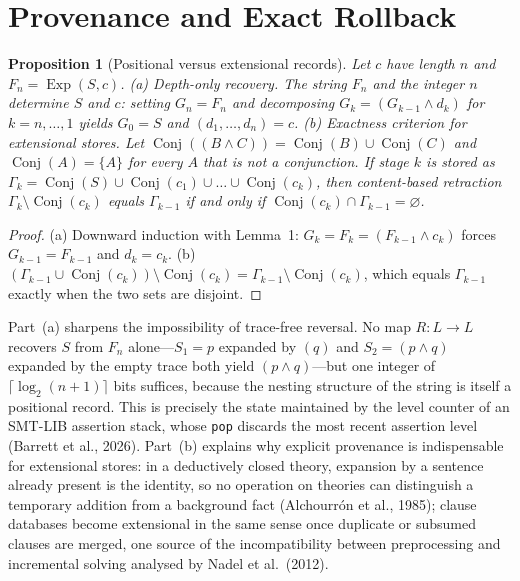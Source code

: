 \documentclass[11pt,reqno]{amsart}
\theoremstyle{plain}
\newtheorem{proposition}{Proposition}
\theoremstyle{definition}
\DeclareMathOperator{\Exp}{Exp}
\DeclareMathOperator{\Conj}{Conj}
\begin{document}
\section{Provenance and Exact Rollback}
\begin{proposition}[Positional versus extensional records]
Let $c$ have length $n$ and $F_n=\Exp(S,c)$.
\textup{(a) Depth-only recovery.} The string $F_n$ and the integer $n$ determine
$S$ and $c$: setting $G_n=F_n$ and decomposing $G_k=(G_{k-1}\wedge d_k)$ for
$k=n,\dots,1$ yields $G_0=S$ and $(d_1,\dots,d_n)=c$.
\textup{(b) Exactness criterion for extensional stores.} Let
$\Conj((B\wedge C))=\Conj(B)\cup\Conj(C)$ and $\Conj(A)=\{A\}$ for every $A$ that
is not a conjunction. If stage $k$ is stored as
$\Gamma_k=\Conj(S)\cup\Conj(c_1)\cup\dots\cup\Conj(c_k)$, then content-based
retraction $\Gamma_k\setminus\Conj(c_k)$ equals $\Gamma_{k-1}$ if and only if
$\Conj(c_k)\cap\Gamma_{k-1}=\varnothing$.
\end{proposition}
\begin{proof}
(a) Downward induction with Lemma~1: $G_k=F_k=(F_{k-1}\wedge c_k)$ forces
$G_{k-1}=F_{k-1}$ and $d_k=c_k$. (b)
$(\Gamma_{k-1}\cup\Conj(c_k))\setminus\Conj(c_k)=\Gamma_{k-1}\setminus\Conj(c_k)$,
which equals $\Gamma_{k-1}$ exactly when the two sets are disjoint.
\end{proof}

Part~(a) sharpens the impossibility of trace-free reversal. No map $R\colon L\to L$
recovers $S$ from $F_n$ alone---$S_1=p$ expanded by $(q)$ and $S_2=(p\wedge q)$
expanded by the empty trace both yield $(p\wedge q)$---but one integer of
$\lceil\log_2(n+1)\rceil$ bits suffices, because the nesting structure of the
string is itself a positional record. This is precisely the state maintained by the
level counter of an SMT-LIB assertion stack, whose \texttt{pop} discards the most
recent assertion level (Barrett et al., 2026). Part~(b) explains why explicit
provenance is indispensable for extensional stores: in a deductively closed theory,
expansion by a sentence already present is the identity, so no operation on
theories can distinguish a temporary addition from a background fact (Alchourr\'on
et al., 1985); clause databases become extensional in the same sense once duplicate
or subsumed clauses are merged, one source of the incompatibility between
preprocessing and incremental solving analysed by Nadel et al.\ (2012).
\end{document}
